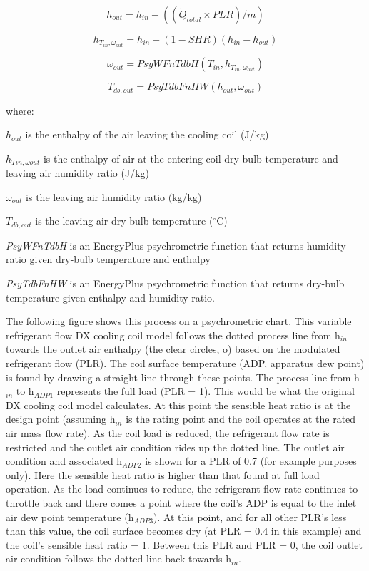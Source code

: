 \begin{equation}
h_{out} = h_{in} - \left( \left( \dot{Q}_{total} \times PLR \right) / \dot{m} \right)
\end{equation}

\begin{equation}
{h_{T_{in},\omega_{out}}} = {h_{in}} - \left( {1 - SHR} \right)\left( {{h_{in}} - {h_{out}}} \right)
\end{equation}

\begin{equation}
{\omega_{out}} = PsyWFnTdbH\left( {{T_{in}},{h_{T_{in},\omega_{out}}}} \right)
\end{equation}

\begin{equation}
{T_{db,out}} = PsyTdbFnHW\left( {{h_{out}},{\omega_{out}}} \right)
\end{equation}

where:

\({{h_{out}}}\) is the enthalpy of the air leaving the cooling coil (J/kg)

\({{h_{Tin,\omega out}}}\) is the enthalpy of air at the entering coil dry-bulb temperature and leaving air humidity ratio (J/kg)

\({{\omega_{out}}}\) is the leaving air humidity ratio (kg/kg)

\({T_{db,out}}\) is the leaving air dry-bulb temperature (\(^{\circ}\)C)

\emph{PsyWFnTdbH} is an EnergyPlus psychrometric function that returns humidity ratio given dry-bulb temperature and enthalpy

\emph{PsyTdbFnHW} is an EnergyPlus psychrometric function that returns dry-bulb temperature given enthalpy and humidity ratio.

The following figure shows this process on a psychrometric chart. This variable refrigerant flow DX cooling coil model follows the dotted process line from h\(_{in}\) towards the outlet air enthalpy (the clear circles, o) based on the modulated refrigerant flow (PLR). The coil surface temperature (ADP, apparatus dew point) is found by drawing a straight line through these points. The process line from h\(_{in}\) to h\(_{ADP1}\) represents the full load (PLR = 1). This would be what the original DX cooling coil model calculates. At this point the sensible heat ratio is at the design point (assuming h\(_{in}\) is the rating point and the coil operates at the rated air mass flow rate). As the coil load is reduced, the refrigerant flow rate is restricted and the outlet air condition rides up the dotted line. The outlet air condition and associated h\(_{ADP2}\) is shown for a PLR of 0.7 (for example purposes only). Here the sensible heat ratio is higher than that found at full load operation. As the load continues to reduce, the refrigerant flow rate continues to throttle back and there comes a point where the coil's ADP is equal to the inlet air dew point temperature (h\(_{ADP3}\)). At this point, and for all other PLR's less than this value, the coil surface becomes dry (at PLR = 0.4 in this example) and the coil's sensible heat ratio = 1. Between this PLR and PLR = 0, the coil outlet air condition follows the dotted line back towards h\(_{in}\).

